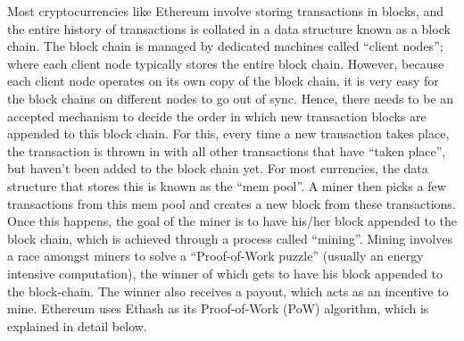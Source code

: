 \documentclass[runningheads]{llncs}
\begin{document}
Most cryptocurrencies like Ethereum involve storing transactions in blocks, and the entire history of transactions is collated in a data structure known as a block chain. The block chain is managed by dedicated machines called ``client nodes''; where each client node typically stores the entire block chain. However, because each client node operates on its own copy of the block chain, it is very easy for the block chains on different nodes to go out of sync. Hence, there needs to be an accepted mechanism to decide the order in which new transaction blocks are appended to this block chain. 
For this, every time a new transaction takes place, the transaction is thrown in with all other transactions that have ``taken place'', but haven't been added to the block chain yet. For most currencies, the data structure that stores this is known as the ``mem pool''. A miner then picks a few transactions from this mem pool and creates a new block from these transactions. Once this happens, the goal of the miner is to have his/her block appended to the block chain, which is achieved through a process called ``mining''.
Mining involves a race amongst miners to solve a ``Proof-of-Work puzzle'' (usually an energy intensive computation), the winner of which gets to have his block appended to the block-chain. The winner also receives a payout, which acts as an incentive to mine. 
Ethereum uses Ethash as its Proof-of-Work (PoW) algorithm, which is explained in detail below.
\end{document}
